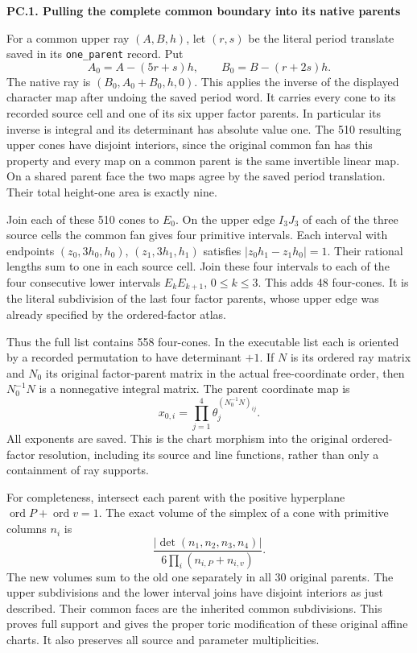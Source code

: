 \par

\medskip\noindent\textbf{PC.1. Pulling the complete common boundary into its native parents}

\par\nobreak

For a common upper ray \((A,B,h)\), let \((r,s)\) be the literal
period translate saved in its \texttt{one\_parent} record. Put
\[
 A_0=A-(5r+s)h,\qquad B_0=B-(r+2s)h.
\]
The native ray is \((B_0,A_0+B_0,h,0)\). This applies the inverse
of the displayed character map after undoing the saved period word.
It carries every cone to its recorded source cell and one of its six
upper factor parents. In particular its inverse is integral and its
determinant has absolute value one. The 510 resulting upper cones
have disjoint interiors, since the original common fan has this
property and every map on a common parent is the same invertible
linear map. On a shared parent face the two maps agree by the saved
period translation. Their total height-one area is exactly nine.

Join each of these 510 cones to \(E_0\). On the upper edge
\(I_3J_3\) of each of the three source cells the common fan gives
four primitive intervals. Each interval with endpoints
\((z_0,3h_0,h_0)\), \((z_1,3h_1,h_1)\) satisfies
\(\lvert z_0h_1-z_1h_0\rvert=1\). Their rational lengths
sum to one in each source cell. Join these four intervals to each
of the four consecutive lower intervals \(E_kE_{k+1}\),
\(0\le k\le3\). This adds 48 four-cones. It is the literal
subdivision of the last four factor parents, whose upper edge was
already specified by the ordered-factor atlas.

Thus the full list contains 558 four-cones. In the executable list
each is oriented by a recorded permutation to have determinant
\(+1\). If \(N\) is its ordered ray matrix and \(N_0\) its
original factor-parent matrix in the actual free-coordinate order,
then \(N_0^{-1}N\) is a nonnegative integral matrix. The parent
coordinate map is
\[
 x_{0,i}=\prod_{j=1}^4\theta_j^{(N_0^{-1}N)_{ij}}.
\tag{PC.1}
\]
All exponents are saved. This is the chart morphism into the
original ordered-factor resolution, including its source and line
functions, rather than only a containment of ray supports.

For completeness, intersect each parent with the positive hyperplane
\(\operatorname{ord}P+\operatorname{ord}v=1\). The exact volume
of the simplex of a cone with primitive columns \(n_i\) is
\[
 \frac{\lvert\det(n_1,n_2,n_3,n_4)\rvert}
 {6\prod_i(n_{i,P}+n_{i,v})}.
\tag{PC.2}
\]
The new volumes sum to the old one separately in all 30 original
parents. The upper subdivisions and the lower interval joins have
disjoint interiors as just described. Their common faces are the
inherited common subdivisions. This proves full support and gives
the proper toric modification of these original affine charts.
It also preserves all source and parameter multiplicities.

